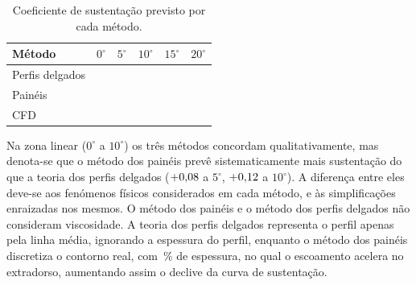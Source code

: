 \begin{table}[H]
  \centering
  \caption{Coeficiente de sustentação previsto por cada método.}
  \label{tab:cl}
  \begin{tabular}{lccccc}
    \toprule
    Método & $0^\circ$ & $5^\circ$ & $10^\circ$ & $15^\circ$ & $20^\circ$ \\
    \midrule
    Perfis delgados & \Resultado{\ClDelgadosZero} & \Resultado{\ClDelgadosCinco} & \Resultado{\ClDelgadosDez} & \Resultado{\ClDelgadosQuinze} & \Resultado{\ClDelgadosVinte} \\
    Painéis         & \Resultado{\ClPaineisZero} & \Resultado{\ClPaineisCinco} & \Resultado{\ClPaineisDez} & \Resultado{\ClPaineisQuinze} & \Resultado{\ClPaineisVinte} \\
    CFD             & \Resultado{\ClCFDZero} & \Resultado{\ClCFDCinco} & \Resultado{\ClCFDDez} & \Resultado{\ClCFDQuinze} & \Resultado{\ClCFDVinte} \\
    \bottomrule
  \end{tabular}
\end{table}

Na zona linear ($0^\circ$ a $10^\circ$) os três métodos concordam
qualitativamente, mas denota-se que o método dos painéis prevê sistematicamente mais
sustentação do que a teoria dos perfis delgados ($+\Resultado{\DifClPaineisDelgadosCinco}$ a $5^\circ$, $+\Resultado{\DifClPaineisDelgadosDez}$
a $10^\circ$). A diferença entre eles deve-se aos fenómenos físicos considerados em cada método, e às simplificações enraizadas nos mesmos. O método dos painéis e o método dos perfis delgados não consideram viscosidade. A teoria dos perfis delgados
representa o perfil apenas pela linha média, ignorando a espessura do perfil, enquanto o método dos painéis
discretiza o contorno real, com \Resultado[0]{\EspessuraPct}\,\% de espessura, no qual o escoamento acelera
no extradorso, aumentando assim o declive da curva de sustentação.


